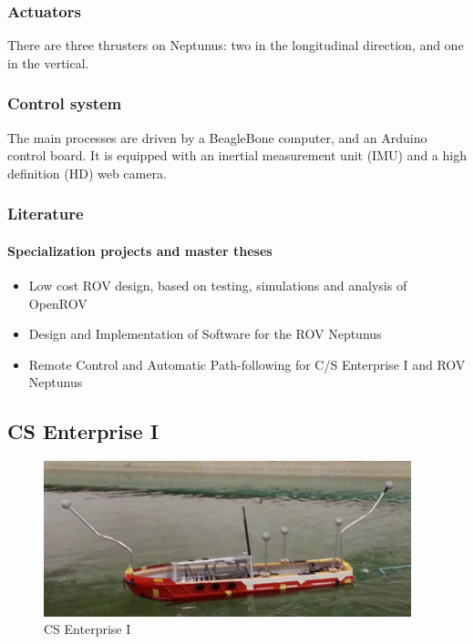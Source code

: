 \documentclass[a4paper,twoside,english]{report}
\begin{document}
\subsubsection{Actuators}

There are three thrusters on Neptunus: two in the longitudinal direction,
and one in the vertical.

\subsubsection{Control system}

The main processes are driven by a BeagleBone computer, and an Arduino
control board. It is equipped with an inertial measurement unit (IMU)
and a high definition (HD) web camera.

\subsubsection{Literature}

\paragraph{Specialization projects and master theses}
\begin{itemize}
\item Low cost ROV design, based on testing, simulations and analysis of
OpenROV\citep{FollestadSandvedValle2014}
\item Design and Implementation of Software for the ROV Neptunus \citep{Munz2015}
\item Remote Control and Automatic Path-following for C/S Enterprise I and
ROV Neptunus \citep{Sandved2015}
\end{itemize}
\clearpage{}

\subsection{CS Enterprise I}

\begin{figure}
\centering \includegraphics[width=0.95\textwidth]{fig/CSE1_2} \caption{\label{fig: Cybership Enterprise 1}CS Enterprise I}
\end{figure}
\end{document}
